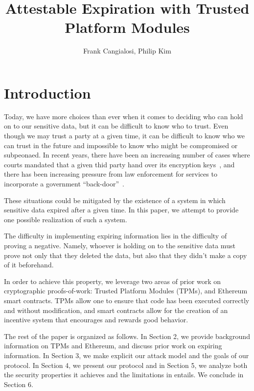 \documentclass{article}
\begin{document}
\title{Attestable Expiration with Trusted Platform Modules}
\author{Frank Cangialosi, Philip Kim}

\maketitle

\section{Introduction}

Today, we have more choices than ever when it comes to deciding who can hold on to our sensitive data, but it can be difficult to know who to trust. Even though we may trust a party at a given time, it can be difficult to know who we can trust in the future and impossible to know who might be compromised or subpeonaed. In recent years, there have been an increasing number of cases where courts mandated that a given thid party hand over its encryption keys~\cite{hushmail}, and there has been increasing pressure from law enforcement for services to incorporate a government ``back-door''~\cite{backdoor}.


These situations could be mitigated by the existence of a system in which sensitive data expired after a given time. In this paper, we attempt to provide one possible realization of such a system.


The difficulty in implementing expiring information lies in the difficulty of proving a negative. Namely, whoever is holding on to the sensitive data must prove not only that they deleted the data, but also that they didn't make a copy of it beforehand.


In order to achieve this property, we leverage two areas of prior work on cryptographic proofs-of-work: Trusted Platform Modules (TPMs), and Ethereum smart contracts. TPMs allow one to ensure that code has been executed correctly and without modification, and smart contracts allow for the creation of an incentive system that encourages and rewards good behavior.

The rest of the paper is organized as follows. In Section 2, we provide background information on TPMs and Ethereum, and discuss prior work on expiring information. In Section 3, we make explicit our attack model and the goals of our protocol. In Section 4, we present our protocol and in Section 5, we analyze both the security properties it achieves and the limitations in entails. We conclude in Section 6.
\end{document}
